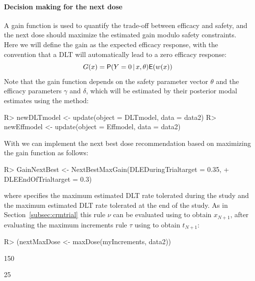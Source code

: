 \documentclass[article]{jss}\usepackage[]{graphicx}\usepackage[]{color}
\newcommand{\given}{\,\vert\,}
\begin{document}
\paragraph{Decision making for the next dose} A gain function is used to quantify the trade-off between efficacy and safety, and the next dose should maximize the estimated gain modulo safety constraints. Here we will define the gain as the expected efficacy response, with the convention that a DLT will automatically lead to a zero efficacy response:
\begin{equation}
\label{eq:gainfunction}
G(x)=\Prob(Y=0 \given x, \theta)\E(w(x))
\end{equation}
Note that the gain function depends on the safety parameter vector $\theta$ and 
the efficacy parameters $\gamma$ and $\delta$, which will be estimated by their 
posterior modal estimates using the  method:
\begin{Schunk}
\begin{Sinput}
R> newDLTmodel <- update(object = DLTmodel, data = data2)
R> newEffmodel <- update(object = Effmodel, data = data2)
\end{Sinput}
\end{Schunk}
With  we can implement the next best dose recommendation 
based on maximizing the gain function as follows:
\begin{Schunk}
\begin{Sinput}
R> GainNextBest <- NextBestMaxGain(DLEDuringTrialtarget = 0.35, 
+                                  DLEEndOfTrialtarget = 0.3)
\end{Sinput}
\end{Schunk}
where  specifies the maximum estimated DLT rate tolerated 
during the study and  the maximum estimated DLT rate tolerated 
at the end of the study. 
As in Section~\ref{subsec:crmtrial} this rule $\nu$ can be evaluated using 
 to obtain $x_{N+1}$, after evaluating the maximum increments rule 
$\tau$ using  to obtain $t_{N+1}$:
\begin{Schunk}
\begin{Sinput}
R> (nextMaxDose <- maxDose(myIncrements, data2))
\end{Sinput}
\begin{Soutput}
[1] 150
\end{Soutput}
\begin{Soutput}
[1] 25
\end{Soutput}
\end{Schunk}
\end{document}
